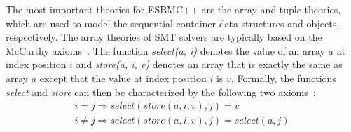 \documentclass[conference]{IEEEtran}
\begin{document}

\smallskip{}
%
The most important theories for ESBMC++ are the array and tuple theories,
which are used to model the sequential container data structures
and objects, respectively.
The array theories of SMT solvers are typically based on the
McCarthy axioms~\cite{McCarthy62}. The function \emph{select(a, i)}
denotes the value of an array $a$ at index position $i$ and \emph{store(a, i, v)}
denotes an array that is exactly the same as array $a$ except that the
value at index position $i$ is $v$. %
Formally, the functions \emph{select} and \emph{store} can then be characterized
by the following two axioms~\cite{CVC07,Boolector09,Z08}:
%
\[
\begin{array}{l}
  i=j      \Rightarrow select\left(store\left(a,i,v\right),j\right)=v \\
  i \neq j \Rightarrow select\left(store\left(a,i,v\right),j\right)=select\left(a,j\right)
\end{array}
\]
\end{document}
